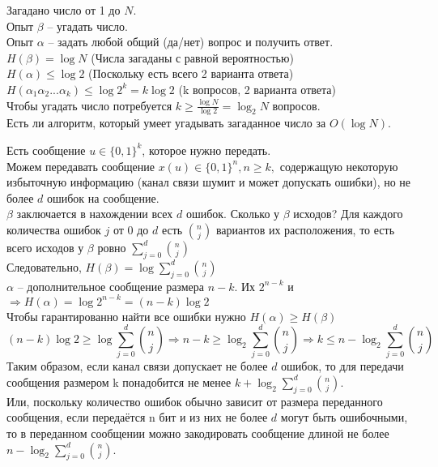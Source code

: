 	\begin{Example}[Данетки]
		Загадано число от 1 до $N$.\\
		Опыт $\beta$ -- угадать число.\\
		Опыт $\alpha$ -- задать любой общий (да/нет) вопрос и получить ответ.\\
		$H(\beta) = \log N$ (Числа загаданы с равной вероятностью)\\
		$H(\alpha) \leqslant \log 2$ (Поскольку есть всего 2 варианта ответа)\\
		$H(\alpha_1 \alpha_2 ... \alpha_k) \leqslant \log 2^k = k \log 2$ (k вопросов, 2 варианта ответа)\\
		Чтобы угадать число потребуется $k \geqslant \frac{\log N}{\log 2} = \log_2 N$ вопросов.\\
		Есть ли алгоритм, который умеет угадывать загаданное число за $O(\log N)$.	
	\end{Example}


	Есть сообщение $u \in \{0, 1\}^k$, которое нужно передать.\\
	Можем передавать сообщение $x(u) \in \{0, 1\}^n, n \geqslant k,$ содержащую некоторую избыточную информацию (канал связи шумит и может допускать ошибки), но не более $d$ ошибок на сообщение.\\
	$\beta$ заключается в нахождении всех $d$ ошибок. Сколько у $\beta$ исходов? Для каждого количества ошибок $j$ от 0 до $d$ есть $\binom{n}{j}$ вариантов их расположения, то есть всего исходов у $\beta$ ровно $\displaystyle \sum_{j=0}^{d} \binom{n}{j}$ \\
	Следовательно, $\displaystyle H(\beta) = \log \sum_{j=0}^{d} \binom{n}{j}$\\
	$\alpha$ -- дополнительное сообщение размера $n - k$. Их $2^{n-k}$ и $\Rightarrow H(\alpha) = \log 2^{n-k} = (n-k) \log 2$\\
	Чтобы гарантированно найти все ошибки нужно $H(\alpha) \geqslant H(\beta)$
	\[(n-k) \log 2 \geqslant \log \sum_{j=0}^{d} \binom{n}{j} \Rightarrow n-k \geqslant \log_2 \sum_{j=0}^{d} \binom{n}{j} \Rightarrow k \leqslant n - \log_2 \sum_{j=0}^{d} \binom{n}{j}\]
	Таким образом, если канал связи допускает не более $d$ ошибок, то для передачи сообщения размером k понадобится не менее $k + \log_2 \sum_{j=0}^{d} \binom{n}{j}$.\\
	Или, поскольку количество ошибок обычно зависит от размера переданного сообщения, если передаётся n бит и из них не более $d$ могут быть ошибочными, то в переданном сообщении можно закодировать сообщение длиной не более $\displaystyle n - \log_2 \sum_{j=0}^{d} \binom{n}{j}$. 
	
